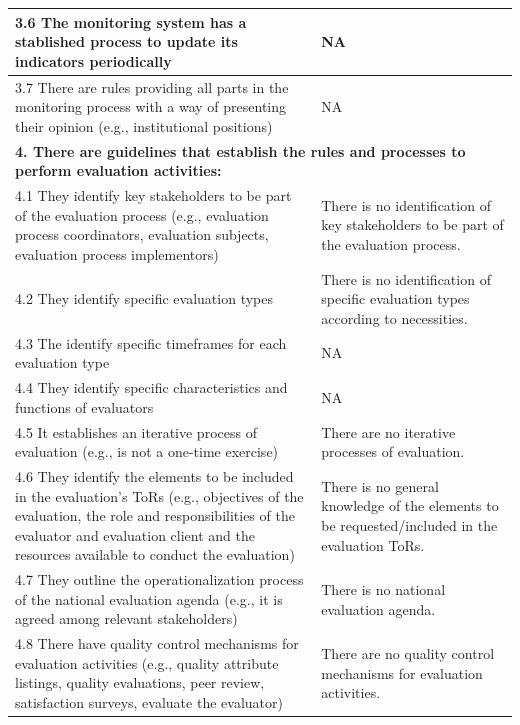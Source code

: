 \documentclass[
  10pt,
]{book}
\begin{document}
\begin{table}
\begin{tabular}[t]{l|l}
\hline
\hspace{1em}3.6 The monitoring system has a stablished process to update its indicators periodically & NA\\
\hline
\hspace{1em}3.7 There are rules providing all parts in the monitoring process with a way of presenting their opinion (e.g., institutional positions) & NA\\
\hline
\multicolumn{2}{l}{\textbf{4. There are guidelines that establish the rules and processes to perform evaluation activities:}}\\
\hline
\hspace{1em}4.1 They identify key stakeholders to be part of the evaluation process (e.g., evaluation process coordinators, evaluation subjects, evaluation process implementors) & There is no identification of key stakeholders to be part of the evaluation process.\\
\hline
\hspace{1em}4.2 They identify specific evaluation types & There is no identification of specific evaluation types according to necessities.\\
\hline
\hspace{1em}4.3 The identify specific timeframes for each evaluation type & NA\\
\hline
\hspace{1em}4.4 They identify specific characteristics and functions of evaluators & NA\\
\hline
\hspace{1em}4.5 It establishes an iterative process of evaluation (e.g., is not a one-time exercise) & There are no iterative processes of evaluation.\\
\hline
\hspace{1em}4.6 They identify the elements to be included in the evaluation's ToRs (e.g., objectives of the evaluation, the role and responsibilities of the evaluator and evaluation client and the resources available to conduct the evaluation) & There is no general knowledge of the elements to be requested/included in the evaluation ToRs.\\
\hline
\hspace{1em}4.7 They outline the operationalization process of the national evaluation agenda (e.g., it is agreed among relevant stakeholders) & There is no national evaluation agenda.\\
\hline
\hspace{1em}4.8 There have quality control mechanisms for evaluation activities (e.g., quality attribute listings, quality evaluations, peer review, satisfaction surveys, evaluate the evaluator) & There are no quality control mechanisms for evaluation activities.\\

\end{tabular}
\end{table}
\end{document}
